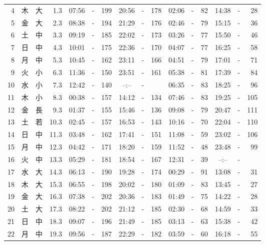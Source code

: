 \documentclass[12pt.a4j]{jsarticle}
\begin{document}
\begin{center}
\begin{table}[ht]
\begin{tabular}{|rc|cr|ccrccr|ccrccr|}
 4 & 木 & 大 &  1.3 &  07:56 &-& 199  &  20:56 &-& 178  &   02:06 &-&  82  &   14:38 &-&  28  \\
 5 & 金 & 大 &  2.3 &  08:38 &-& 194  &  21:29 &-& 176  &   02:46 &-&  79  &   15:15 &-&  36  \\
 6 & 土 & 中 &  3.3 &  09:19 &-& 185  &  22:02 &-& 173  &   03:26 &-&  77  &   15:50 &-&  46  \\
 7 & 日 & 中 &  4.3 &  10:01 &-& 175  &  22:36 &-& 170  &   04:07 &-&  77  &   16:25 &-&  58  \\
 8 & 月 & 中 &  5.3 &  10:45 &-& 162  &  23:11 &-& 166  &   04:51 &-&  79  &   17:01 &-&  71  \\
 9 & 火 & 小 &  6.3 &  11:36 &-& 150  &  23:51 &-& 161  &   05:38 &-&  81  &   17:39 &-&  84  \\
10 & 水 & 小 &  7.3 &  12:42 &-& 140  &  --:-- &-&     &   06:35 &-&  83  &   18:25 &-&  96  \\
11 & 木 & 小 &  8.3 &  00:38 &-& 157  &  14:12 &-& 134  &   07:46 &-&  83  &   19:25 &-& 105  \\
12 & 金 & 長 &  9.3 &  01:37 &-& 155  &  15:46 &-& 136  &   09:08 &-&  79  &   20:47 &-& 111  \\
13 & 土 & 若 & 10.3 &  02:45 &-& 157  &  16:53 &-& 143  &   10:16 &-&  70  &   22:04 &-& 110  \\
14 & 日 & 中 & 11.3 &  03:48 &-& 162  &  17:41 &-& 151  &   11:08 &-&  59  &   23:02 &-& 106  \\
15 & 月 & 中 & 12.3 &  04:42 &-& 171  &  18:20 &-& 159  &   11:52 &-&  48  &   23:48 &-&  99  \\
16 & 火 & 中 & 13.3 &  05:29 &-& 181  &  18:54 &-& 167  &   12:31 &-&  39  &   --:-- &-&     \\
17 & 水 & 大 & 14.3 &  06:13 &-& 190  &  19:28 &-& 174  &   00:29 &-&  91  &   13:08 &-&  31  \\
18 & 木 & 大 & 15.3 &  06:55 &-& 198  &  20:02 &-& 180  &   01:09 &-&  83  &   13:45 &-&  27  \\
19 & 金 & 大 & 16.3 &  07:38 &-& 202  &  20:36 &-& 183  &   01:49 &-&  75  &   14:22 &-&  28  \\
20 & 土 & 大 & 17.3 &  08:22 &-& 202  &  21:12 &-& 185  &   02:30 &-&  68  &   14:59 &-&  33  \\
21 & 日 & 中 & 18.3 &  09:07 &-& 196  &  21:49 &-& 185  &   03:13 &-&  63  &   15:38 &-&  42  \\
22 & 月 & 中 & 19.3 &  09:56 &-& 187  &  22:29 &-& 182  &   03:59 &-&  60  &   16:18 &-&  55  \\

\end{tabular}
\end{table}
\end{center}
\end{document}

